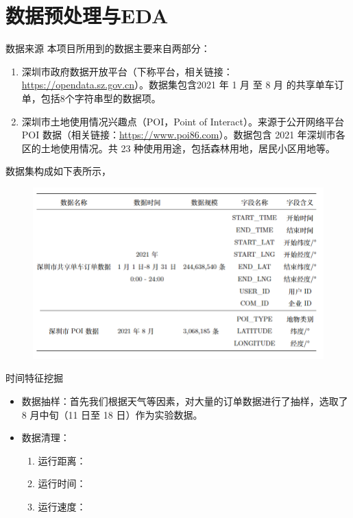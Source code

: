 \documentclass[11pt,aspectratio=149]{ctexbeamer}
\begin{document}
\section{数据预处理与EDA}


\begin{frame}{数据来源}
本项目所用到的数据主要来自两部分：
\begin{enumerate}
\item 深圳市政府数据开放平台（下称平台，相关链接： \href{https://opendata.sz.gov.cn/data/api/toApiDetails/29200_00403627}{https://opendata.sz.gov.cn}）。数据集包含2021 年 1 月 至 8 月 的共享单车订单，包括8个字符串型的数据项。
\item 深圳市土地使用情况兴趣点（POI，Point of Interact）。来源于公开网络平台 POI 数据（相关链接：\href{https://www.poi86.com/poi/amap/city/440300.html}{https://www.poi86.com}）。数据包含 2021 年深圳市各区的土地使用情况。共 23 种使用用途，包括森林用地，居民小区用地等。
\end{enumerate}
\end{frame}

数据集构成如下表所示，
\begin{figure}
    \centering
    \includegraphics[width=0.8\linewidth]{Figs/数据格式.png}
    \label{fig:enter-label}
\end{figure}

\begin{frame}{时间特征挖掘}
    \begin{itemize}
        \item 数据抽样：首先我们根据天气等因素，对大量的订单数据进行了抽样，选取了8 月中旬（11 日至 18 日）作为实验数据。
        \item 数据清理：
        \begin{enumerate}
            \item 运行距离：
            \item 运行时间：
            \item 运行速度：
        \end{enumerate}
    \end{itemize}
\end{frame}
\end{document}
